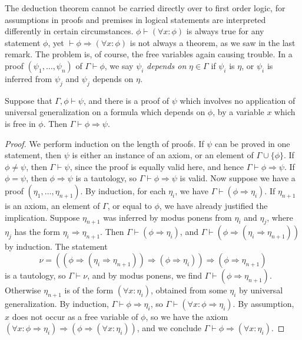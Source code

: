 The deduction theorem cannot be carried directly over to first order logic, for assumptions in proofs and premises in logical statements are interpreted differently in certain circumstances. $\phi \vdash (\forall x: \phi)$ is always true for any statement $\phi$, yet $\vdash \phi \Rightarrow (\forall x: \phi)$ is not always a theorem, as we saw in the last remark. The problem is, of course, the free variables again causing trouble. In a proof $(\psi_1, \dots, \psi_n)$ of $\Gamma \vdash \phi$, we say $\psi_i$ \emph{depends on} $\eta \in \Gamma$ if $\psi_i$ is $\eta$, or $\psi_i$ is inferred from $\psi_j$ and $\psi_j$ depends on $\eta$.

\begin{theorem}
    Suppose that $\Gamma, \phi \vdash \psi$, and there is a proof of $\psi$ which involves no application of universal generalization on a formula which depends on $\phi$, by a variable $x$ which is free in $\phi$. Then $\Gamma \vdash \phi \Rightarrow \psi$.
\end{theorem}
\begin{proof}
    We perform induction on the length of proofs. If $\psi$ can be proved in one statement, then $\psi$ is either an instance of an axiom, or an element of $\Gamma \cup \{ \phi \}$. If $\phi \neq \psi$, then $\Gamma \vdash \psi$,  since the proof is equally valid here, and hence $\Gamma \vdash \phi \Rightarrow \psi$. If $\phi = \psi$, then $\phi \Rightarrow \psi$ is a tautology, so $\Gamma \vdash \phi \Rightarrow \psi$ is valid. Now suppose we have a proof $(\eta_1, \dots, \eta_{n+1})$. By induction, for each $\eta_i$, we have $\Gamma \vdash (\phi \Rightarrow \eta_i)$. If $\eta_{n+1}$ is an axiom, an element of $\Gamma$, or equal to $\phi$, we have already justified the implication. Suppose $\eta_{n+1}$ was inferred by modus ponens from $\eta_i$ and $\eta_j$, where $\eta_j$ has the form $\eta_i \Rightarrow \eta_{n+1}$. Then $\Gamma \vdash (\phi \Rightarrow \eta_i)$, and $\Gamma \vdash (\phi \Rightarrow (\eta_i \Rightarrow \eta_{n+1}))$ by induction. The statement
    \[ \nu = ((\phi \Rightarrow (\eta_i \Rightarrow \eta_{n+1})) \Rightarrow (\phi \Rightarrow \eta_i)) \Rightarrow (\phi \Rightarrow \eta_{n+1}) \]
    is a tautology, so $\Gamma \vdash \nu$, and by modus ponens, we find $\Gamma \vdash (\phi \Rightarrow \eta_{n+1})$. Otherwise $\eta_{n+1}$ is of the form $(\forall x: \eta_i)$, obtained from some $\eta_i$ by universal generalization. By induction, $\Gamma \vdash \phi \Rightarrow \eta_i$, so $\Gamma \vdash (\forall x: \phi \Rightarrow \eta_i)$. By assumption, $x$ does not occur as a free variable of $\phi$, so we have the axiom $(\forall x: \phi \Rightarrow \eta_i) \Rightarrow (\phi \Rightarrow (\forall x: \eta_i))$, and we conclude $\Gamma \vdash \phi \Rightarrow (\forall x: \eta_i)$.
\end{proof}

